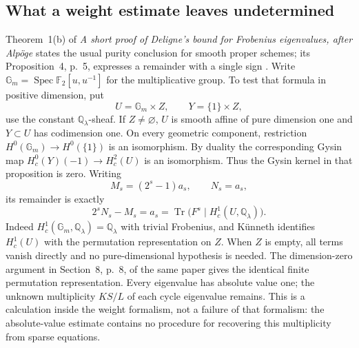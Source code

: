 \subsection{What a weight estimate leaves undetermined}
Theorem~1(b) of \emph{A short proof of Deligne's bound for Frobenius eigenvalues, after Alp\"oge} states the usual purity conclusion for smooth proper schemes; its Proposition~4, p.~5, expresses a remainder with a single sign \cite{ff-sign}. Write $\mathbb G_m=\operatorname{Spec}\mathbb F_2[u,u^{-1}]$ for the multiplicative group. To test that formula in positive dimension, put
\[
 U=\mathbb G_m\times Z,\qquad Y=\{1\}\times Z,
\]
use the constant $\mathbb Q_\lambda$-sheaf. If $Z\neq\varnothing$, $U$ is smooth affine of pure dimension one and $Y\subset U$ has codimension one. On every geometric component, restriction $H^0(\mathbb G_m)\to H^0(\{1\})$ is an isomorphism. By duality the corresponding Gysin map
$H_c^0(Y)(-1)\to H_c^2(U)$ is an isomorphism. Thus the Gysin kernel in that proposition is zero. Writing
\[
 M_s=(2^s-1)a_s,\qquad N_s=a_s,
\]
its remainder is exactly
\[
 2^sN_s-M_s=a_s
 =\operatorname{Tr}\bigl(F^s\mid H_c^1(U,\mathbb Q_\lambda)\bigr).
\]
Indeed $H_c^1(\mathbb G_m,\mathbb Q_\lambda)=\mathbb Q_\lambda$ with trivial Frobenius, and K\"unneth identifies $H_c^1(U)$ with the permutation representation on $Z$. When $Z$ is empty, all terms vanish directly and no pure-dimensional hypothesis is needed. The dimension-zero argument in Section~8, p.~8, of the same paper gives the identical finite permutation representation. Every eigenvalue has absolute value one; the unknown multiplicity $KS/L$ of each cycle eigenvalue remains. This is a calculation inside the weight formalism, not a failure of that formalism: the absolute-value estimate contains no procedure for recovering this multiplicity from sparse equations.

